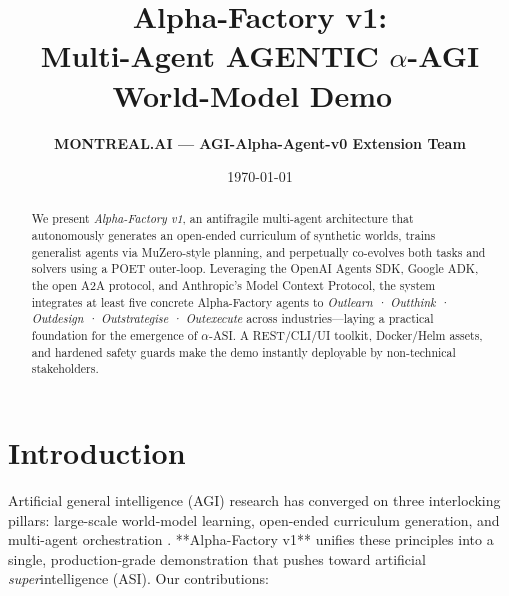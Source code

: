 
\newtheorem{theorem}{Theorem}[section]

\title{\bfseries Alpha-Factory v1:\\
  Multi-Agent AGENTIC \boldmath$\alpha$-AGI World-Model Demo
  \texorpdfstring{\,}{}}
\author{\textbf{MONTREAL.AI — AGI-Alpha-Agent-v0 Extension Team}}
\date{\today}

\maketitle
\begin{abstract}\noindent
We present \emph{Alpha-Factory v1}, an antifragile multi-agent architecture
that autonomously generates an open-ended curriculum of synthetic worlds,
trains generalist agents via MuZero-style planning, and perpetually co-evolves
both tasks and solvers using a POET outer-loop.  Leveraging the OpenAI Agents
SDK, Google ADK, the open \textsc{A2A} protocol, and Anthropic’s Model Context
Protocol, the system integrates at least five concrete Alpha-Factory agents to
\emph{Outlearn · Outthink · Outdesign · Outstrategise · Outexecute} across
industries—laying a practical foundation for the emergence of $\alpha$-ASI.  
A REST/CLI/UI toolkit, Docker/Helm assets, and hardened safety guards make the
demo instantly deployable by non-technical stakeholders.
\end{abstract}

\tableofcontents
\newpage

\section{Introduction}\label{sec:intro}

Artificial general intelligence (AGI) research has converged on three
interlocking pillars: large-scale world-model learning, open-ended
curriculum generation, and multi-agent orchestration
\parencite{clune2019aiga,wang2019poet,ecoffet2021open}.  **Alpha-Factory v1**
unifies these principles into a single, production-grade demonstration that
pushes toward artificial \emph{super}intelligence (ASI).  
Our contributions:

